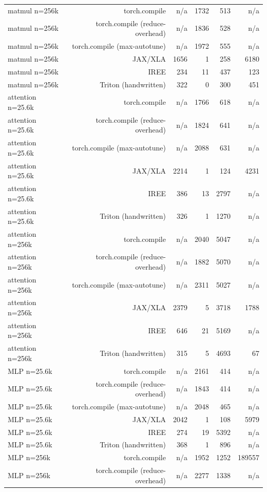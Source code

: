 \begin{tabular}{lrrrrr}
matmul n=256k & torch.compile & n/a & 1732 & 513 & n/a \\
matmul n=256k & torch.compile (reduce-overhead) & n/a & 1836 & 528 & n/a \\
matmul n=256k & torch.compile (max-autotune) & n/a & 1972 & 555 & n/a \\
matmul n=256k & JAX/XLA & 1656 & 1 & 258 & 6180 \\
matmul n=256k & IREE & 234 & 11 & 437 & 123 \\
matmul n=256k & Triton (handwritten) & 322 & 0 & 300 & 451 \\
attention n=25.6k & torch.compile & n/a & 1766 & 618 & n/a \\
attention n=25.6k & torch.compile (reduce-overhead) & n/a & 1824 & 641 & n/a \\
attention n=25.6k & torch.compile (max-autotune) & n/a & 2088 & 631 & n/a \\
attention n=25.6k & JAX/XLA & 2214 & 1 & 124 & 4231 \\
attention n=25.6k & IREE & 386 & 13 & 2797 & n/a \\
attention n=25.6k & Triton (handwritten) & 326 & 1 & 1270 & n/a \\
attention n=256k & torch.compile & n/a & 2040 & 5047 & n/a \\
attention n=256k & torch.compile (reduce-overhead) & n/a & 1882 & 5070 & n/a \\
attention n=256k & torch.compile (max-autotune) & n/a & 2311 & 5027 & n/a \\
attention n=256k & JAX/XLA & 2379 & 5 & 3718 & 1788 \\
attention n=256k & IREE & 646 & 21 & 5169 & n/a \\
attention n=256k & Triton (handwritten) & 315 & 5 & 4693 & 67 \\
MLP n=25.6k & torch.compile & n/a & 2161 & 414 & n/a \\
MLP n=25.6k & torch.compile (reduce-overhead) & n/a & 1843 & 414 & n/a \\
MLP n=25.6k & torch.compile (max-autotune) & n/a & 2048 & 465 & n/a \\
MLP n=25.6k & JAX/XLA & 2042 & 1 & 108 & 5979 \\
MLP n=25.6k & IREE & 274 & 19 & 5392 & n/a \\
MLP n=25.6k & Triton (handwritten) & 368 & 1 & 896 & n/a \\
MLP n=256k & torch.compile & n/a & 1952 & 1252 & 189557 \\
MLP n=256k & torch.compile (reduce-overhead) & n/a & 2277 & 1338 & n/a \\

\end{tabular}
